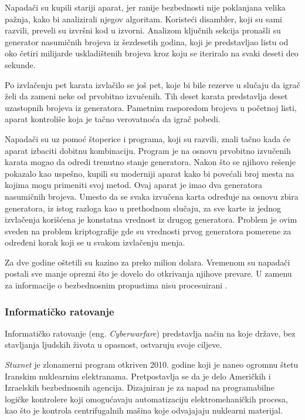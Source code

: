\documentclass[a4paper]{article}
\begin{document}
Napadači su kupili stariji aparat, jer ranije bezbednosti nije poklanjana velika pažnja, kako bi analizirali njegov algoritam. Koristeći disambler, koji su sami razvili, preveli su izvršni kod u izvorni. Analizom ključnih sekcija pronašli su generator nasumičnih brojeva iz šezdesetih godina, koji je predstavljao listu od oko četiri milijarde uskladištenih brojeva kroz koju se iteriralo na svaki deseti deo sekunde.

Po izvlačenju pet karata izvlačilo se još pet, koje bi bile rezerve u slučaju da igrač želi da zameni neke od prvobitno izvučenih. Tih deset karata predstavlja deset uzastopnih brojeva iz generatora. Pametnim rasporedom brojeva u početnoj listi, aparat kontroliše koja je tačno verovatnoća da igrač pobedi. 

Napadači su uz pomoć štoperice i programa, koji su razvili, znali tačno kada će aparat izbaciti dobitnu kombinaciju. Program je na osnovu prvobitno izvučenih karata mogao da odredi trenutno stanje generatora.
Nakon što se njihovo rešenje pokazalo kao uspešno, kupili su moderniji aparat kako bi povećali broj mesta na kojima mogu primeniti svoj metod. Ovaj aparat je imao dva generatora nasumičnih brojeva. Umesto da se svaka izvučena karta određuje na osnovu zbira generatora, iz istog razloga kao u prethodnom slučaju, za sve karte iz jednog izvlačenja korišćena je konstatna vrednost iz drugog generatora. Problem je ovim sveden na problem kriptografije gde su vrednosti prvog generatora pomerene za određeni korak koji se u svakom izvlačenju menja.

Za dve godine oštetili su kazino za preko milion dolara. Vremenom su napadači postali sve manje oprezni što je dovelo do otkrivanja njihove prevare. U zamenu za informacije o bezbednosnim propustima nisu procesuirani \cite{intrusion}.

\subsubsection{Informatičko ratovanje}
\label{cyberwarfare}

Informatičko ratovanje (eng. \textit{Cyberwarfare}) predstavlja način na koje države, bez stavljanja ljudskih života u opasnost, ostvaruju svoje ciljeve.

\textit{Stuxnet} je zlonamerni program otkriven 2010. godine koji je naneo ogromnu štetu Iranskim nuklearnim elektranama. Pretpostavlja se da je delo Američkih i Izraelskih bezbednosnih agencija. Dizajniran je za napad na programabilne logičke kontrolere koji omogućavaju automatizaciju elektromehaničkih procesa, kao što je kontrola centrifugalnih mašina koje odvajajaju nuklearni materijal.
\end{document}
